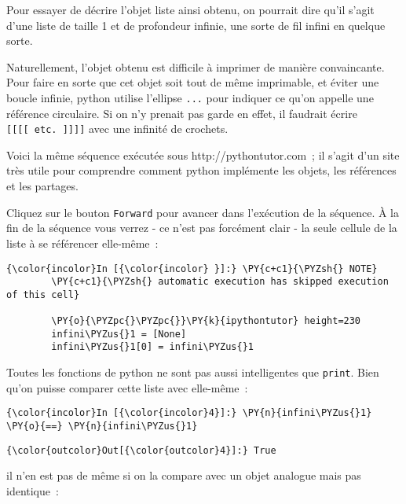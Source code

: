     Pour essayer de décrire l'objet liste ainsi obtenu, on pourrait dire
qu'il s'agit d'une liste de taille 1 et de profondeur infinie, une sorte
de fil infini en quelque sorte.

Naturellement, l'objet obtenu est difficile à imprimer de manière
convaincante. Pour faire en sorte que cet objet soit tout de même
imprimable, et éviter une boucle infinie, python utilise l'ellipse
\texttt{...} pour indiquer ce qu'on appelle une référence circulaire. Si
on n'y prenait pas garde en effet, il faudrait écrire
\texttt{{[}{[}{[}{[}\ etc.\ {]}{]}{]}{]}} avec une infinité de crochets.

    Voici la même séquence exécutée sous http://pythontutor.com~; il s'agit
d'un site très utile pour comprendre comment python implémente les
objets, les références et les partages.

Cliquez sur le bouton \texttt{Forward} pour avancer dans l'exécution de
la séquence. À la fin de la séquence vous verrez - ce n'est pas
forcément clair - la seule cellule de la liste à se référencer
elle-même~:

    \begin{Verbatim}[commandchars=\\\{\}]
{\color{incolor}In [{\color{incolor} }]:} \PY{c+c1}{\PYZsh{} NOTE}
        \PY{c+c1}{\PYZsh{} automatic execution has skipped execution of this cell}
        
        \PY{o}{\PYZpc{}\PYZpc{}}\PY{k}{ipythontutor} height=230
        infini\PYZus{}1 = [None]
        infini\PYZus{}1[0] = infini\PYZus{}1
\end{Verbatim}


    Toutes les fonctions de python ne sont pas aussi intelligentes que
\texttt{print}. Bien qu'on puisse comparer cette liste avec elle-même~:

    \begin{Verbatim}[commandchars=\\\{\}]
{\color{incolor}In [{\color{incolor}4}]:} \PY{n}{infini\PYZus{}1} \PY{o}{==} \PY{n}{infini\PYZus{}1}
\end{Verbatim}


\begin{Verbatim}[commandchars=\\\{\}]
{\color{outcolor}Out[{\color{outcolor}4}]:} True
\end{Verbatim}
            
    il n'en est pas de même si on la compare avec un objet analogue mais pas
identique~:

